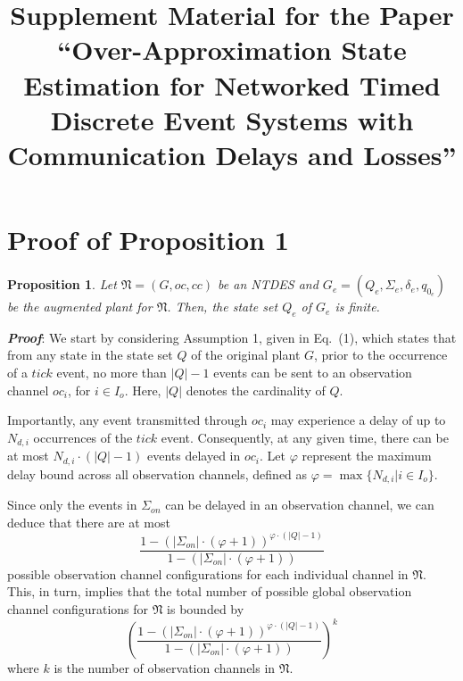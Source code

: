 \documentclass[journal,twocolumn,web]{IEEEtran}
\newtheorem{proposition}{Proposition}
\begin{document}
	\title{Supplement Material for the Paper ``Over-Approximation State Estimation for Networked Timed Discrete Event Systems with Communication Delays and Losses''}

	
	\maketitle
	
	
	

	

	


	\section{Proof of Proposition 1}
	
	\begin{proposition}\label{pp1}
		Let $\mathfrak{N}=(G,oc,cc)$ be an NTDES and $G_e=(Q_e,\Sigma_e,\delta_e,q_{0_e})$ be the augmented plant for $\mathfrak{N}$. Then, the state set $Q_e$ of $G_e$ is finite.
	\end{proposition}
	\textbf{\emph{Proof}}:
		We start by considering Assumption 1, given in Eq.~(1), which states that from any state in the state set $Q$ of the original plant $G$, prior to the occurrence of a $tick$ event, no more than $|Q|-1$ events can be sent to an observation channel $oc_i$, for $i\in I_o$. Here, $|Q|$ denotes the cardinality of $Q$.  
		
		Importantly, any event transmitted through $oc_i$ may experience a delay of up to $N_{d,i}$ occurrences of the $tick$ event. Consequently, at any given time, there can be at most $N_{d,i} \cdot (|Q|-1)$ events delayed in $oc_i$. Let $\varphi$ represent the maximum delay bound across all observation channels, defined as $\varphi = \max\{N_{d,i} | i \in I_o\}$.  
		
		Since only the events in $\Sigma_{on}$ can be delayed in an observation channel, we can deduce that there are at most  
		\begin{equation*}  
			\frac{1 - (|\Sigma_{on}| \cdot (\varphi + 1))^{\varphi \cdot (|Q|-1)}}{1 - (|\Sigma_{on}| \cdot (\varphi + 1))}  
		\end{equation*}  
		possible observation channel configurations for each individual channel in $\mathfrak{N}$. This, in turn, implies that the total number of possible global observation channel configurations for $\mathfrak{N}$ is bounded by  
		\begin{equation*}  
			\left( \frac{1 - (|\Sigma_{on}| \cdot (\varphi + 1))^{\varphi \cdot (|Q|-1)}}{1 - (|\Sigma_{on}| \cdot (\varphi + 1))} \right)^k  
		\end{equation*}  
		where $k$ is the number of observation channels in $\mathfrak{N}$.  
		
\end{document}
